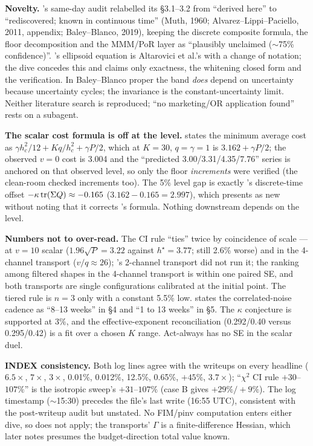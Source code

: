 \begin{reviewernote}[(compiler)]
\textbf{Novelty.} 's same-day audit relabelled its \S3.1--3.2 from ``derived here'' to ``rediscovered; known in continuous time'' (Muth, 1960; Alvarez--Lippi--Paciello, 2011, appendix; Baley--Blanco, 2019), keeping the discrete composite formula, the floor decomposition and the MMM/PoR layer as ``plausibly unclaimed ($\sim$75\% confidence)''. 's ellipsoid equation is Altarovici et al.'s with a change of notation; the dive concedes this and claims only exactness, the whitening closed form and the verification. In Baley--Blanco proper the band \emph{does} depend on uncertainty because uncertainty cycles; the invariance is the constant-uncertainty limit. Neither literature search is reproduced; ``no marketing/OR application found'' rests on a subagent.

\textbf{The scalar cost formula is off at the level.}  states the minimum average cost as $\gamma h_c^2/12 + Kq/h_c^2 + \gamma P/2$, which at $K = 30$, $q = \gamma = 1$ is $3.162 + \gamma P/2$; the observed $v = 0$ cost is 3.004 and the ``predicted 3.00/3.31/4.35/7.76'' series is anchored on that observed level, so only the floor \emph{increments} were verified (the clean-room checked increments too). The 5\% level gap is exactly 's discrete-time offset $-\kappa\operatorname{tr}(\Sigma Q) \approx -0.165$ ($3.162 - 0.165 = 2.997$), which  presents as new without noting that it corrects 's formula. Nothing downstream depends on the level.

\textbf{Numbers not to over-read.} The CI rule ``ties'' twice by coincidence of scale --- at $v = 10$ scalar ($1.96\sqrt P = 3.22$ against $h^\star = 3.77$; still 2.6\% worse) and in the 4-channel transport ($v/q \approx 26$); 's 2-channel transport did not run it; the ranking among filtered shapes in the 4-channel transport is within one paired SE, and both transports are single configurations calibrated at the initial point. The tiered rule is $n = 3$ only with a constant 5.5\% low.  states the correlated-noise cadence as ``8--13 weeks'' in \S4 and ``1 to 13 weeks'' in \S5. The $\kappa$ conjecture is supported at 3\%, and the effective-exponent reconciliation (0.292/0.40 versus 0.295/0.42) is a fit over a chosen $K$ range. Act-always has no SE in the scalar duel.

\textbf{INDEX consistency.} Both log lines agree with the writeups on every headline ($6.5\times$, $7\times$, $3\times$, 0.01\%, 0.012\%, 12.5\%, 0.65\%, $+45\%$, $3.7\times$); ``$\chi^2$ CI rule $+30$--$107\%$'' is the isotropic sweep's $+31$--$107\%$ (case B gives $+29\%/+9\%$). The  log timestamp ($\sim$15:30) precedes the file's last write (16:55 UTC), consistent with the post-writeup audit but unstated. No FIM/pinv computation enters either dive, so  does not apply; the transports' $\Gamma$ is a finite-difference Hessian, which  later notes presumes the budget-direction total value known.
\end{reviewernote}

